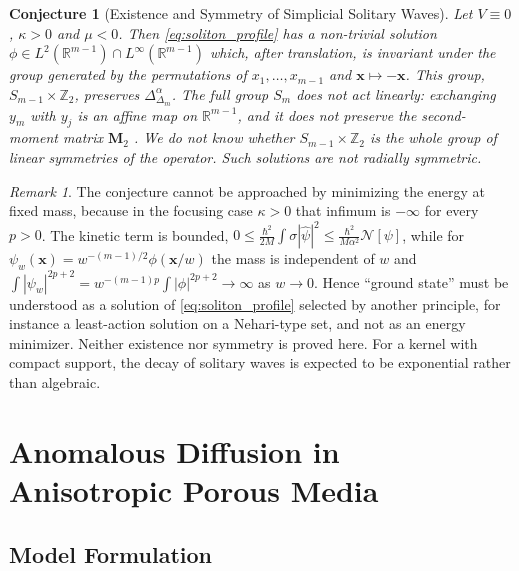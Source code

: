 \documentclass[11pt,a4paper]{article}
\theoremstyle{plain}
\newtheorem{conjecture}[theorem]{Conjecture}
\theoremstyle{definition}
\theoremstyle{remark}
\newtheorem{remark}[theorem]{Remark}
\numberwithin{equation}{section}
\begin{document}
\begin{conjecture}[Existence and Symmetry of Simplicial Solitary Waves]
Let $V \equiv 0$, $\kappa > 0$ and $\mu < 0$. Then \eqref{eq:soliton_profile} has a non-trivial solution $\phi \in L^2(\mathbb{R}^{m-1}) \cap L^\infty(\mathbb{R}^{m-1})$ which, after translation, is invariant under the group generated by the permutations of $x_1, \dots, x_{m-1}$ and $\mathbf{x} \mapsto -\mathbf{x}$. This group, $S_{m-1} \times \mathbb{Z}_2$, preserves $\Delta_{\Delta_m}^\alpha$. The full group $S_m$ does not act linearly: exchanging $y_m$ with $y_j$ is an affine map on $\mathbb{R}^{m-1}$, and it does not preserve the second-moment matrix $\mathbf{M}_2$ \cite[Rem.~7.3]{silvafilho2026simplex}. We do not know whether $S_{m-1} \times \mathbb{Z}_2$ is the whole group of linear symmetries of the operator. Such solutions are not radially symmetric.
\end{conjecture}

\begin{remark}
The conjecture cannot be approached by minimizing the energy at fixed mass, because in the focusing case $\kappa > 0$ that infimum is $-\infty$ for every $p > 0$. The kinetic term is bounded, $0 \le \frac{\hbar^2}{2M}\int\sigma|\widehat\psi|^2 \le \frac{\hbar^2}{M\alpha^2}\mathcal{N}[\psi]$, while for $\psi_w(\mathbf{x}) = w^{-(m-1)/2}\phi(\mathbf{x}/w)$ the mass is independent of $w$ and $\int|\psi_w|^{2p+2} = w^{-(m-1)p}\int|\phi|^{2p+2} \to \infty$ as $w \to 0$. Hence ``ground state'' must be understood as a solution of \eqref{eq:soliton_profile} selected by another principle, for instance a least-action solution on a Nehari-type set, and not as an energy minimizer. Neither existence nor symmetry is proved here. For a kernel with compact support, the decay of solitary waves is expected to be exponential rather than algebraic.
\end{remark}

\section{Anomalous Diffusion in Anisotropic Porous Media}

\subsection{Model Formulation}
\end{document}
